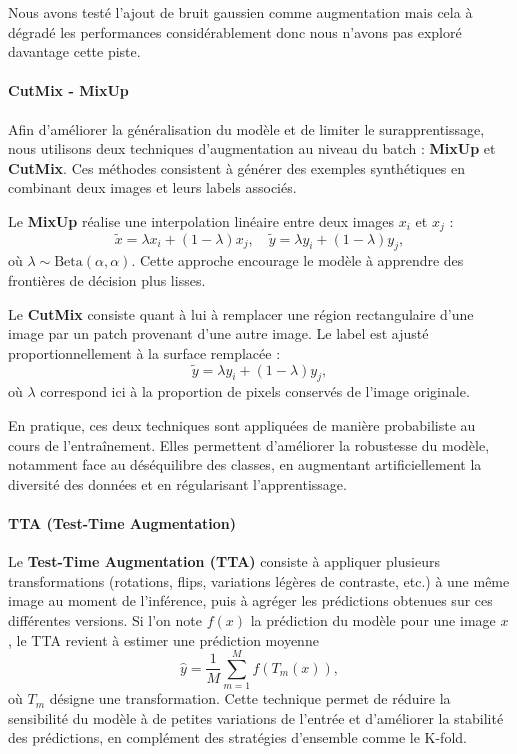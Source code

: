 \documentclass[journal,twocolumn]{IEEEtran}
\begin{document}
Nous avons testé l'ajout de bruit gaussien comme augmentation mais cela à dégradé les performances considérablement donc nous n'avons pas exploré davantage cette piste.

\paragraph{CutMix - MixUp}

Afin d'améliorer la généralisation du modèle et de limiter le surapprentissage, nous utilisons deux techniques d'augmentation au niveau du batch : \textbf{MixUp} et \textbf{CutMix}. Ces méthodes consistent à générer des exemples synthétiques en combinant deux images et leurs labels associés.

Le \textbf{MixUp} réalise une interpolation linéaire entre deux images $x_i$ et $x_j$ :
\begin{equation}
\tilde{x} = \lambda x_i + (1 - \lambda) x_j, \quad 
\tilde{y} = \lambda y_i + (1 - \lambda) y_j,
\end{equation}
où $\lambda \sim \text{Beta}(\alpha, \alpha)$. Cette approche encourage le modèle à apprendre des frontières de décision plus lisses.

Le \textbf{CutMix} consiste quant à lui à remplacer une région rectangulaire d'une image par un patch provenant d'une autre image. Le label est ajusté proportionnellement à la surface remplacée :
\begin{equation}
\tilde{y} = \lambda y_i + (1 - \lambda) y_j,
\end{equation}
où $\lambda$ correspond ici à la proportion de pixels conservés de l'image originale.

En pratique, ces deux techniques sont appliquées de manière probabiliste au cours de l'entraînement. Elles permettent d'améliorer la robustesse du modèle, notamment face au déséquilibre des classes, en augmentant artificiellement la diversité des données et en régularisant l'apprentissage.

\paragraph{TTA (Test-Time Augmentation)}

Le \textbf{Test-Time Augmentation (TTA)} consiste à appliquer plusieurs transformations (rotations, flips, variations légères de contraste, etc.) à une même image au moment de l’inférence, puis à agréger les prédictions obtenues sur ces différentes versions. Si l’on note $f(x)$ la prédiction du modèle pour une image $x$, le TTA revient à estimer une prédiction moyenne
\begin{equation}
\hat{y} = \frac{1}{M} \sum_{m=1}^{M} f(T_m(x)),
\end{equation}
où $T_m$ désigne une transformation. Cette technique permet de réduire la sensibilité du modèle à de petites variations de l’entrée et d’améliorer la stabilité des prédictions, en complément des stratégies d’ensemble comme le K-fold.
\end{document}
